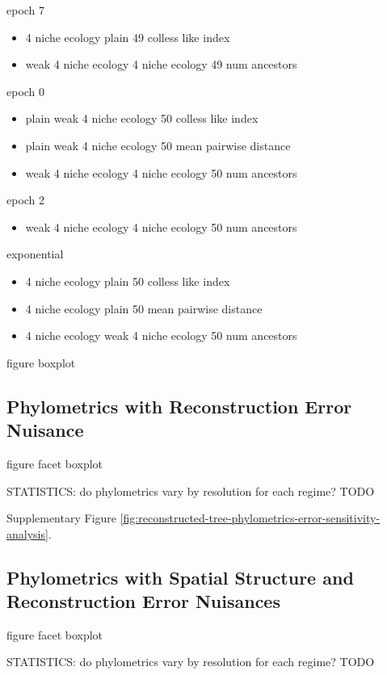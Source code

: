 epoch 7
\begin{itemize}
    \item 4 niche ecology	plain	49	colless like index
\item weak 4 niche ecology	4 niche ecology	49	num ancestors
\end{itemize}

epoch 0
\begin{itemize}

\item plain	weak 4 niche ecology	50	colless like index
\item plain	weak 4 niche ecology	50	mean pairwise distance
\item weak 4 niche ecology	4 niche ecology	50	num ancestors

\end{itemize}

epoch 2
\begin{itemize}
    \item weak 4 niche ecology	4 niche ecology	50	num ancestors
\end{itemize}

exponential
\begin{itemize}
    \item 4 niche ecology	plain	50	colless like index
    \item 4 niche ecology	plain	50	mean pairwise distance
    \item 4 niche ecology	weak 4 niche ecology	50	num ancestors
\end{itemize}

figure boxplot


\subsection{Phylometrics with Reconstruction Error Nuisance}



figure facet boxplot

STATISTICS: do phylometrics vary by resolution for each regime?
TODO



Supplementary Figure \ref{fig:reconstructed-tree-phylometrics-error-sensitivity-analysis}.

\subsection{Phylometrics with Spatial Structure and Reconstruction Error Nuisances}

figure facet boxplot


STATISTICS: do phylometrics vary by resolution for each regime?
TODO


